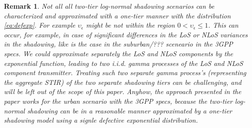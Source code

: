 \documentclass[lettersize,journal]{IEEEtran}
\newtheorem*{remark}{Remark}
\begin{document}
\begin{remark}
  Not all all two-tier log-normal shadowing scenarios can be characterized and approximated with a one-tier manner with the distribution \eqref{eq:defexp}. For example $\upsilon_{\epsilon}$ might be not within the region $0<\upsilon_{\epsilon} \leq 1$. This can occur, for example, in case of significant differences in the LoS or NLoS variances in the shadowing, like is the case in the suburban/??? sceneario in the 3GPP specs. We could approximate separately the LoS and NLoS components by the exponential function, leading to two i.i.d. gamma processes of the LoS and NLoS component transmitter. Treating such two separate gamma process's (representing the aggregate STIR) of the two separate shadowing tiers can be challenging, and will be left out of the scope of this paper. Anyhow, the approach presented in the paper works for the urban scenario with the 3GPP specs, because the two-tier log-normal shadowing can be in a reasonable manner approximated by a one-tier shadowing model using a signle defective exponential distribution.
\end{remark}



%

\end{document}
